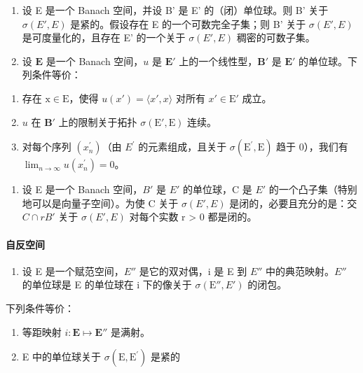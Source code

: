 \begin{enumerate}
\def\labelenumi{\arabic{enumi})}
\setcounter{enumi}{18}
\item
  设 E 是一个 Banach 空间，并设 B' 是 E' 的（闭）单位球。则 B' 关于 \(\sigma(E', E)\) 是紧的。假设存在 E 的一个可数完全子集；则 B' 关于 \(\sigma(E', E)\) 是可度量化的，且存在 E' 的一个关于 \(\sigma(E', E)\) 稠密的可数子集。
\item
  设 \(\mathbf{E}\) 是一个 Banach 空间，\(u\) 是 \(\mathbf{E}'\) 上的一个线性型，\(\mathbf{B}'\) 是 \(\mathbf{E}'\) 的单位球。下列条件等价：
\end{enumerate}

\begin{enumerate}
\def\labelenumi{(\roman{enumi})}
\item
  存在 \(\mathrm{x} \in \mathrm{E}\)，使得 \(u(x') = \langle x', x \rangle\) 对所有 \(x' \in \mathrm{E}'\) 成立。
\item
  \(u\) 在 \(\mathbf{B}'\) 上的限制关于拓扑 \(\sigma(\mathrm{E}', \mathrm{E})\) 连续。
\item
  对每个序列 \((x_{n}^{\prime})\)（由 \(E^{\prime}\) 的元素组成，且关于 \(\sigma(\mathrm{E}^{\prime}, \mathrm{E})\) 趋于 0），我们有 \(\lim_{n \to \infty} u(x_{n}^{\prime}) = 0\)。
\end{enumerate}

\begin{enumerate}
\def\labelenumi{\arabic{enumi})}
\setcounter{enumi}{20}
\tightlist
\item
  设 E 是一个 Banach 空间，\(B'\) 是 \(E'\) 的单位球，C 是 \(E'\) 的一个凸子集（特别地可以是向量子空间）。为使 C 关于 \(\sigma(E', E)\) 是闭的，必要且充分的是：交 \(C \cap rB'\) 关于 \(\sigma(E', E)\) 对每个实数 r \textgreater{} 0 都是闭的。
\end{enumerate}

\paragraph{自反空间}

\begin{enumerate}
\def\labelenumi{\arabic{enumi})}
\setcounter{enumi}{21}
\tightlist
\item
   设 E 是一个赋范空间，\(E''\) 是它的双对偶，i 是 E 到 \(E''\) 中的典范映射。\(E''\) 的单位球是 E 的单位球在 i 下的像关于 \(\sigma(\mathrm{E}'', E')\) 的闭包。
\end{enumerate}

下列条件等价：

\begin{enumerate}
\def\labelenumi{(\roman{enumi})}
\item
  等距映射 \(i:\mathbf{E}\mapsto \mathbf{E}''\) 是满射。
\item
  E 中的单位球关于 \(\sigma (\mathrm{E},\mathrm{E}^{\prime})\) 是紧的
\end{enumerate}

